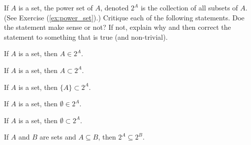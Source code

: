 \item  If $A$ is a set, the power set of $A$, denoted $2^A$ is the collection of all subsets of $A$. (See Exercise (\ref{ex:power_set}).) Critique each of the following statements. Doe the statement make sense or not? If not, explain why and then correct the statement to something that is true (and non-trivial).  
	\ba

	\item If $A$ is a set, then $A \in 2^A$.

	\item If $A$ is a set, then $A \subset 2^A$.

	\item If $A$ is a set, then $\{A\} \subset 2^A$.

	\item If $A$ is a set, then $\emptyset \in 2^A$.

	\item If $A$ is a set, then $\emptyset \subset 2^A$.

	\item If $A$ and $B$ are sets and $A \subseteq B$, then $2^A \subseteq 2^B$. 

	\ea
	
\begin{comment}
	
\ExerciseSolution

\ba

	\item This statement makes sense because $A$ is a subset of $A$. Since $2^A$ is the collection of subsets of $A$, it follows that $A \in 2^A$. 

	\item This statement doesn't make sense. The set $A$ is an element of $2^A$, not a subset. For example, if $A = \{1\}$, then $2^A = \{\emptyset, A\}$, and $A$ is not a subset of $2^A$. The set $\{A\}$ would be a subset of $2^A$. 

	\item  This statement makes sense. The element of the set $\{A\}$ is also an element of $2^A$, so $\{A\} \subset 2^A$.

	\item  This statement makes sense. Recall that $\emptyset$ is a subset of any set, so $\emptyset$ is a subset of $A$. That makes $\emptyset$ an element of $2^A$. 

	\item  This statement makes sense. The empty set is a subset of any set since every element of $\emptyset$ is an element of any set. 
	
	\item  This statement makes sense. Suppose $S \in 2^A$. Then $S$ is a subset of $A$. If $s \in S$, then $s \in A \subseteq B$, so $s \in B$. Thus, $S \subseteq B$. By definition, then, $S \in 2^B$. Therefore, $2^A \subseteq 2^B$. 
	
\ea

\end{comment}
	

